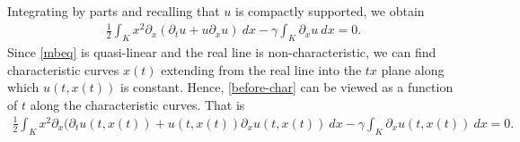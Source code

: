 \documentclass[12pt,reqno]{amsart}
\newcommand{\p}{\partial}
\theoremstyle{plain}  %
\begin{document}
%
%
Integrating by parts and recalling that $u$ is compactly supported, we 
obtain
%
%
\begin{equation}
	\label{before-char}
	\begin{split}
		\frac{1}{2} \int_K x^2 \p_x (\p_t u + u \p_x u) \ dx - \gamma \int_K 
		\p_x u \ dx = 0.
	\end{split}
\end{equation}
%
%
Since \eqref{mbeq} is quasi-linear and the real line is 
non-characteristic, we can find characteristic curves $x(t)$
extending from the real line into the $tx$ plane along which $u(t, x(t))$ is 
constant. Hence, \eqref{before-char} can be viewed as a function of $t$ 
along the characteristic curves. That is
\begin{equation}
	\label{after-char}
	\begin{split}
		\frac{1}{2} \int_K x^2 \p_x (\p_t u(t, x(t)) + u(t, x(t)) \p_x u(t, 
		x(t)) \ dx - \gamma \int_K 
		\p_x u(t,x(t)) \ dx = 0.
	\end{split}
\end{equation}
\end{document}
